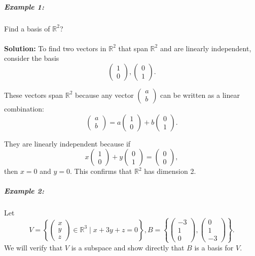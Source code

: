 \documentclass[a4paper,12pt]{article}
\begin{document}
\subparagraph{Example 1:} Find a basis of \(\mathbb{R}^2\)?\\
\\
\textbf{Solution:} To find two vectors in \( \mathbb{R}^2 \) that span \( \mathbb{R}^2 \) and are linearly independent, consider the basis 
\[
\begin{pmatrix} 1 \\ 0 \end{pmatrix}, \begin{pmatrix} 0 \\ 1 \end{pmatrix}.
\]

These vectors span \( \mathbb{R}^2 \) because any vector \( \begin{pmatrix} a \\ b \end{pmatrix} \) can be written as a linear combination:
\[
\begin{pmatrix} a \\ b \end{pmatrix} = a \begin{pmatrix} 1 \\ 0 \end{pmatrix} + b \begin{pmatrix} 0 \\ 1 \end{pmatrix}.
\]

They are linearly independent because if 
\[
x \begin{pmatrix} 1 \\ 0 \end{pmatrix} + y \begin{pmatrix} 0 \\ 1 \end{pmatrix} = \begin{pmatrix} 0 \\ 0 \end{pmatrix},
\]
then \( x = 0 \) and \( y = 0 \). This confirms that \( \mathbb{R}^2 \) has dimension 2.
\newpage

\subparagraph{Example 2:}Let 
\[
V = \left\{ \begin{pmatrix} x \\ y \\ z \end{pmatrix} \in \mathbb{R}^3 \mid x + 3y + z = 0 \right\},
B = \left\{ \begin{pmatrix} -3 \\ 1 \\ 0 \end{pmatrix}, \begin{pmatrix} 0 \\ 1 \\ -3 \end{pmatrix} \right\}.
\]
We will verify that \( V \) is a subspace and show directly that \( B \) is a basis for \( V \).
\end{document}
